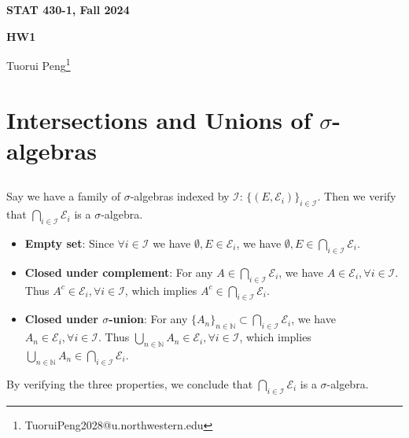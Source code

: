 \documentclass[11pt,a4paper]{article}
\numberwithin{equation}{section}%
\begin{document}
\begin{center}\thispagestyle{plain}

{\LARGE\textbf{STAT 430-1, Fall 2024}}

{\Large\textbf{HW1}}

Tuorui Peng\footnote{TuoruiPeng2028@u.northwestern.edu}
\end{center}

\thispagestyle{myheadings}
\pagestyle{myheadings}

\setcounter{tocdepth}{1}
\tableofcontents


  


\section{Intersections and Unions of $ \sigma  $-algebras}

\subsection{}
Say we have a family of $ \sigma $-algebras indexed by $ \mathcal{I} $: $ \{(E,\mathcal{E}_i)\}_{i\in \mathcal{I}} $. Then we verify that $ \bigcap_{i\in \mathcal{I}} \mathcal{E}_i $ is a $ \sigma $-algebra.

\begin{itemize}[topsep=2pt,itemsep=0pt]
    \item \textbf{Empty set}: Since $ \forall i\in \mathcal{I} $ we have $ \emptyset, E \in \mathcal{E}_i $, we have $ \emptyset, E\in \bigcap_{i\in \mathcal{I}} \mathcal{E}_i $.
    \item \textbf{Closed under complement}: For any $ A\in \bigcap_{i\in \mathcal{I}} \mathcal{E}_i $, we have $ A\in \mathcal{E}_i, \forall i\in \mathcal{I} $. Thus $ A^c\in \mathcal{E}_i, \forall i\in \mathcal{I} $, which implies $ A^c\in \bigcap_{i\in \mathcal{I}} \mathcal{E}_i $.
    \item \textbf{Closed under $ \sigma  $-union}: For any $ \{A_n\}_{n\in \mathbb{N}}\subset \bigcap_{i\in \mathcal{I}} \mathcal{E}_i $, we have $ A_n\in \mathcal{E}_i, \forall i\in \mathcal{I} $. Thus $ \bigcup_{n\in \mathbb{N}} A_n\in \mathcal{E}_i, \forall i\in \mathcal{I} $, which implies $ \bigcup_{n\in \mathbb{N}} A_n\in \bigcap_{i\in \mathcal{I}} \mathcal{E}_i $.
\end{itemize}
By verifying the three properties, we conclude that $ \bigcap_{i\in \mathcal{I}} \mathcal{E}_i $ is a $ \sigma $-algebra.
\end{document}
